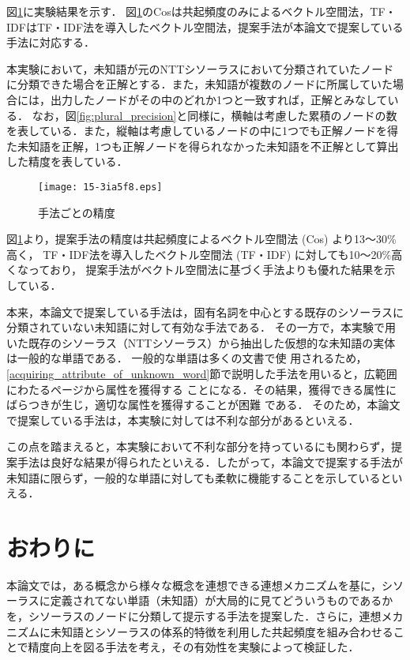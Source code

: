 \documentclass[japanese]{jnlp_1.4}
\begin{document}
図\ref{fig:comparison_result}に実験結果を示す．
図\ref{fig:comparison_result}のCosは共起頻度のみによるベクトル空間法，TF・IDFはTF・IDF法を導入したベクトル空間法，提案手法が本論文で提案している手法に対応する．

本実験において，未知語が元のNTTシソーラスにおいて分類されていたノードに分類できた場合を正解とする．また，未知語が複数のノードに所属していた場合には，出力したノードがその中のどれか1つと一致すれば，正解とみなしている．
なお，図\ref{fig:plural_precision}と同様に，横軸は考慮した累積のノードの数を表している．また，縦軸は考慮しているノードの中に1つでも正解ノードを得た未知語を正解，1つも正解ノードを得られなかった未知語を不正解として算出した精度を表している．

\begin{figure}[t]
\begin{center}
\texttt{[image: 15-3ia5f8.eps]}
\end{center}
\caption{手法ごとの精度}
\label{fig:comparison_result}
\end{figure}

図\ref{fig:comparison_result}より，提案手法の精度は共起頻度によるベクトル空間法 (Cos) より13〜30\%高く，
TF・IDF法を導入したベクトル空間法 (TF・IDF) に対しても10〜20\%高くなっており，
提案手法がベクトル空間法に基づく手法よりも優れた結果を示している．

本来，本論文で提案している手法は，固有名詞を中心とする既存のシソーラスに分類されていない未知語に対して有効な手法である．
その一方で，本実験で用いた既存のシソーラス（NTTシソーラス）から抽出した仮想的な未知語の実体は一般的な単語である．
一般的な単語は多くの文書で使
用されるため，\ref{acquiring_attribute_of_unknown_word}節で説明した手法を用いると，広範囲にわたるページから属性を獲得する
ことになる．その結果，獲得できる属性にばらつきが生じ，適切な属性を獲得することが困難
である．
そのため，本論文で提案している手法は，本実験に対しては不利な部分があるといえる．

この点を踏まえると，本実験において不利な部分を持っているにも関わらず，提案手法は良好な結果が得られたといえる．したがって，本論文で提案する手法が未知語に限らず，一般的な単語に対しても柔軟に機能することを示しているといえる．


\section{おわりに}

本論文では，ある概念から様々な概念を連想できる連想メカニズムを基に，シソーラスに定義されてない単語（未知語）が大局的に見てどういうものであるかを，シソーラスのノードに分類して提示する手法を提案した．さらに，連想メカニズムに未知語とシソーラスの体系的特徴を利用した共起頻度を組み合わせることで精度向上を図る手法を考え，その有効性を実験によって検証した．
\end{document}
